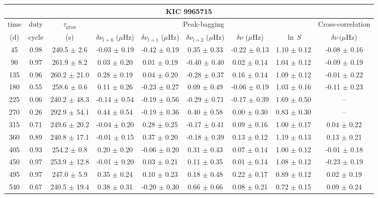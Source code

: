 \documentclass[twocolumn]{aastex61}%
\begin{document}
\begin{table*}[ht]\centering\fontsize{9.}{7.}\selectfont
\begin{tabular}{ccc|ccccc|c}
\multicolumn{9}{c}{KIC 9965715}\\ \hline\hline
time & duty & $\tau_\text{gran}$ &\multicolumn{5}{c|}{Peak-bagging}&Cross-correlation\\
(d)& cycle & (s)&$\delta\nu_{l=0}$ ($\mu$Hz) & $\delta\nu_{l=1}$ ($\mu$Hz) & $\delta\nu_{l=2}$ ($\mu$Hz) & $\delta\nu$ ($\mu$Hz)& $\ln\,S$ & $\delta\nu\,(\mu$Hz)\\\hline
45 & 0.98 & 240.5 $\pm$ 2.6 & -0.03 $\pm$ 0.19 & -0.42 $\pm$ 0.19 & 0.35 $\pm$ 0.33 & -0.22 $\pm$ 0.13 & 1.10 $\pm$ 0.12 & -0.08 $\pm$ 0.16\\
90 & 0.97 & 261.9 $\pm$ 8.2 & 0.03 $\pm$ 0.20 & 0.01 $\pm$ 0.19 & -0.40 $\pm$ 0.40 & 0.02 $\pm$ 0.14 & 1.04 $\pm$ 0.12 & -0.09 $\pm$ 0.19\\
135 & 0.96 & 260.2 $\pm$ 21.0 & 0.28 $\pm$ 0.19 & 0.04 $\pm$ 0.20 & -0.28 $\pm$ 0.37 & 0.16 $\pm$ 0.14 & 1.09 $\pm$ 0.12 & -0.01 $\pm$ 0.22\\
180 & 0.55 & 258.6 $\pm$ 0.6 & 0.11 $\pm$ 0.26 & -0.23 $\pm$ 0.27 & 0.09 $\pm$ 0.49 & -0.06 $\pm$ 0.19 & 1.03 $\pm$ 0.16 & -0.11 $\pm$ 0.23\\
225 & 0.06 & 240.2 $\pm$ 48.3 & -0.14 $\pm$ 0.54 & -0.19 $\pm$ 0.56 & -0.29 $\pm$ 0.71 & -0.17 $\pm$ 0.39 & 1.69 $\pm$ 0.50 & --\\
270 & 0.26 & 292.9 $\pm$ 54.1 & 0.44 $\pm$ 0.54 & -0.19 $\pm$ 0.36 & 0.40 $\pm$ 0.58 & 0.00 $\pm$ 0.30 & 0.83 $\pm$ 0.30 & --\\
315 & 0.71 & 249.6 $\pm$ 20.2 & -0.04 $\pm$ 0.20 & 0.28 $\pm$ 0.25 & -0.17 $\pm$ 0.41 & 0.09 $\pm$ 0.16 & 1.00 $\pm$ 0.17 & 0.04 $\pm$ 0.22\\
360 & 0.89 & 240.8 $\pm$ 17.1 & -0.01 $\pm$ 0.15 & 0.37 $\pm$ 0.20 & -0.18 $\pm$ 0.39 & 0.13 $\pm$ 0.12 & 1.19 $\pm$ 0.13 & 0.13 $\pm$ 0.21\\
405 & 0.93 & 254.2 $\pm$ 0.8 & 0.20 $\pm$ 0.20 & -0.06 $\pm$ 0.20 & 0.31 $\pm$ 0.43 & 0.07 $\pm$ 0.14 & 1.00 $\pm$ 0.12 & -0.01 $\pm$ 0.18\\
450 & 0.97 & 253.9 $\pm$ 12.8 & -0.01 $\pm$ 0.20 & 0.03 $\pm$ 0.21 & 0.11 $\pm$ 0.35 & 0.01 $\pm$ 0.14 & 1.08 $\pm$ 0.12 & -0.23 $\pm$ 0.19\\
495 & 0.97 & 247.0 $\pm$ 5.9 & 0.35 $\pm$ 0.24 & 0.10 $\pm$ 0.23 & 0.18 $\pm$ 0.48 & 0.22 $\pm$ 0.17 & 0.89 $\pm$ 0.12 & 0.02 $\pm$ 0.19\\
540 & 0.67 & 240.5 $\pm$ 19.4 & 0.38 $\pm$ 0.31 & -0.20 $\pm$ 0.30 & 0.66 $\pm$ 0.66 & 0.08 $\pm$ 0.21 & 0.72 $\pm$ 0.15 & 0.09 $\pm$ 0.24\\

\end{tabular}
\end{table*}
\end{document}
